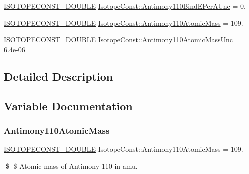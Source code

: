 \begin{DoxyCompactItemize}
\mbox{\hyperlink{group___isotope_const-_macros_ga8f45a7272ce02c0b4c65c44636ed719a}{I\+S\+O\+T\+O\+P\+E\+C\+O\+N\+S\+T\+\_\+\+D\+O\+U\+B\+LE}} \mbox{\hyperlink{group___isotope_const-_antimony-_sb110_gac3e73a19ee68ff3e4c3b61027bfa3ac4}{Isotope\+Const\+::\+Antimony110\+Bind\+E\+Per\+A\+Unc}} = 0.
\item 
\mbox{\hyperlink{group___isotope_const-_macros_ga8f45a7272ce02c0b4c65c44636ed719a}{I\+S\+O\+T\+O\+P\+E\+C\+O\+N\+S\+T\+\_\+\+D\+O\+U\+B\+LE}} \mbox{\hyperlink{group___isotope_const-_antimony-_sb110_gaee5c06968d730dc3b1c3fbbfe9a45681}{Isotope\+Const\+::\+Antimony110\+Atomic\+Mass}} = 109.
\item 
\mbox{\hyperlink{group___isotope_const-_macros_ga8f45a7272ce02c0b4c65c44636ed719a}{I\+S\+O\+T\+O\+P\+E\+C\+O\+N\+S\+T\+\_\+\+D\+O\+U\+B\+LE}} \mbox{\hyperlink{group___isotope_const-_antimony-_sb110_ga6b5928c61b40ccd6f69be478207fe9a8}{Isotope\+Const\+::\+Antimony110\+Atomic\+Mass\+Unc}} = 6.\+4e-\/06
\end{DoxyCompactItemize}


\subsection{Detailed Description}


\subsection{Variable Documentation}
\mbox{\label{group___isotope_const-_antimony-_sb110_gaee5c06968d730dc3b1c3fbbfe9a45681}} 
\subsubsection{\texorpdfstring{Antimony110\+Atomic\+Mass}{Antimony110AtomicMass}}
{\footnotesize\ttfamily \mbox{\hyperlink{group___isotope_const-_macros_ga8f45a7272ce02c0b4c65c44636ed719a}{I\+S\+O\+T\+O\+P\+E\+C\+O\+N\+S\+T\+\_\+\+D\+O\+U\+B\+LE}} Isotope\+Const\+::\+Antimony110\+Atomic\+Mass = 109.}

\$ \$ Atomic mass of Antimony-\/110 in amu. \mbox{\label{group___isotope_const-_antimony-_sb110_ga6b5928c61b40ccd6f69be478207fe9a8}} 
